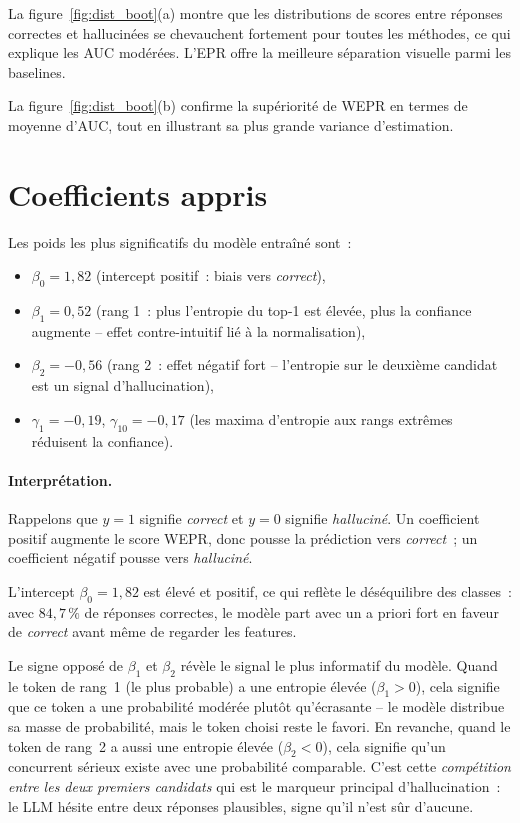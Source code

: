 \documentclass[11pt,a4paper]{article}
\begin{document}
La figure~\ref{fig:dist_boot}(a) montre que les distributions de scores entre réponses correctes et hallucinées se chevauchent fortement pour toutes les méthodes, ce qui explique les AUC modérées. L'EPR offre la meilleure séparation visuelle parmi les baselines.

La figure~\ref{fig:dist_boot}(b) confirme la supériorité de WEPR en termes de moyenne d'AUC, tout en illustrant sa plus grande variance d'estimation.

\section{Coefficients appris}

Les poids les plus significatifs du modèle entraîné sont~:
\begin{itemize}
    \item $\beta_0 = 1{,}82$ (intercept positif~: biais vers \emph{correct}),
    \item $\beta_1 = 0{,}52$ (rang 1~: plus l'entropie du top-1 est élevée, plus la confiance augmente -- effet contre-intuitif lié à la normalisation),
    \item $\beta_2 = -0{,}56$ (rang 2~: effet négatif fort -- l'entropie sur le deuxième candidat est un signal d'hallucination),
    \item $\gamma_1 = -0{,}19$, $\gamma_{10} = -0{,}17$ (les maxima d'entropie aux rangs extrêmes réduisent la confiance).
\end{itemize}

\paragraph{Interprétation.}
Rappelons que $y = 1$ signifie \emph{correct} et $y = 0$ signifie \emph{halluciné}. Un coefficient positif augmente le score WEPR, donc pousse la prédiction vers \emph{correct}~; un coefficient négatif pousse vers \emph{halluciné}.

L'intercept $\beta_0 = 1{,}82$ est élevé et positif, ce qui reflète le déséquilibre des classes~: avec $84{,}7\,\%$ de réponses correctes, le modèle part avec un a priori fort en faveur de \emph{correct} avant même de regarder les features.

Le signe opposé de $\beta_1$ et $\beta_2$ révèle le signal le plus informatif du modèle. Quand le token de rang~1 (le plus probable) a une entropie élevée ($\beta_1 > 0$), cela signifie que ce token a une probabilité modérée plutôt qu'écrasante -- le modèle distribue sa masse de probabilité, mais le token choisi reste le favori. En revanche, quand le token de rang~2 a aussi une entropie élevée ($\beta_2 < 0$), cela signifie qu'un concurrent sérieux existe avec une probabilité comparable. C'est cette \emph{compétition entre les deux premiers candidats} qui est le marqueur principal d'hallucination~: le LLM hésite entre deux réponses plausibles, signe qu'il n'est sûr d'aucune.
\end{document}
